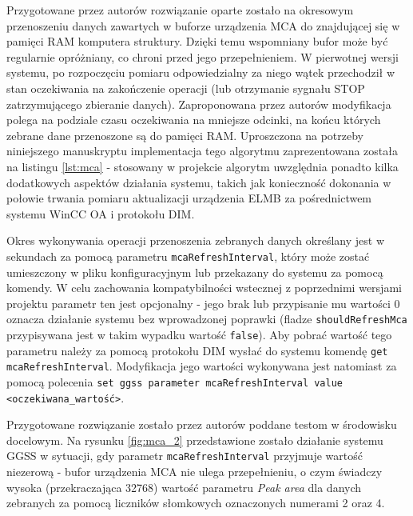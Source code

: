 Przygotowane przez autorów rozwiązanie oparte zostało na okresowym przenoszeniu danych zawartych w buforze urządzenia MCA do znajdującej się w pamięci RAM komputera struktury. Dzięki temu wspomniany bufor może być regularnie opróżniany, co chroni przed jego przepełnieniem. W pierwotnej wersji systemu, po rozpoczęciu pomiaru odpowiedzialny za niego wątek przechodził w stan oczekiwania na zakończenie operacji (lub otrzymanie sygnału STOP zatrzymującego zbieranie danych). Zaproponowana przez autorów modyfikacja polega na podziale czasu oczekiwania na mniejsze odcinki, na końcu których zebrane dane przenoszone są do pamięci RAM. Uproszczona na potrzeby niniejszego manuskryptu implementacja tego algorytmu zaprezentowana została na listingu \ref{lst:mca} - stosowany w projekcie algorytm uwzględnia ponadto kilka dodatkowych aspektów działania systemu, takich jak konieczność dokonania w połowie trwania pomiaru aktualizacji urządzenia ELMB za pośrednictwem systemu WinCC OA i protokołu DIM.



Okres wykonywania operacji przenoszenia zebranych danych określany jest w sekundach za pomocą parametru \lstinline{mcaRefreshInterval}, który może zostać umieszczony w pliku konfiguracyjnym lub przekazany do systemu za pomocą komendy. W celu zachowania kompatybilności wstecznej z poprzednimi wersjami projektu parametr ten jest opcjonalny - jego brak lub przypisanie mu wartości 0 oznacza działanie systemu bez wprowadzonej poprawki (fladze \lstinline{shouldRefreshMca} przypisywana jest w takim wypadku wartość \lstinline{false}). Aby pobrać wartość tego parametru należy za pomocą protokołu DIM wysłać do systemu komendę \lstinline{get mcaRefreshInterval}. Modyfikacja jego wartości wykonywana jest natomiast za pomocą polecenia \lstinline{set ggss parameter mcaRefreshInterval value <oczekiwana_wartość>}. 

Przygotowane rozwiązanie zostało przez autorów poddane testom w środowisku docelowym. Na rysunku \ref{fig:mca_2} przedstawione zostało działanie systemu GGSS w sytuacji, gdy parametr \lstinline{mcaRefreshInterval} przyjmuje wartość niezerową - bufor urządzenia MCA nie ulega przepełnieniu, o czym świadczy wysoka (przekraczająca 32768) wartość parametru \emph{Peak area} dla danych zebranych za pomocą liczników słomkowych oznaczonych numerami 2 oraz 4.

